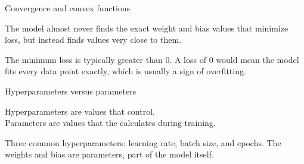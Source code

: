 \begin{frame}{Convergence and convex functions}
  \begin{withmargin}
    \begin{tdmargin}
      The model almost never finds the exact weight and bias values that
      minimize loss, but instead finds values very close to them.
      \par\medskip
      The minimum loss is typically greater than 0. A loss of 0 would mean the
      model fits every data point exactly, which is usually a sign of
      overfitting.
    \end{tdmargin}
  \end{withmargin}
\end{frame}

\begin{frame}{Hyperparameters versus parameters}
  \vfill
  \begin{takeaway}
    Hyperparameters are values that  control.\\
    Parameters are values that the  calculates during training.
  \end{takeaway}
  \vfill
  {\small Three common hyperparameters: learning rate, batch size, and epochs.
  The weights and bias are parameters, part of the model itself.}
\end{frame}

